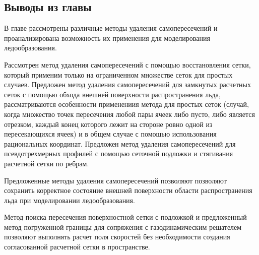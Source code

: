 \subsection{Выводы из главы}

В главе рассмотрены различные методы удаления самопересечений и проанализирована возможность их применения для моделирования ледообразования.

Рассмотрен метод удаления самопересечений с помощью восстановления сетки, который применим только на ограниченном множестве сеток для простых случаев.
Предложен метод удаления самопересечений для замкнутых расчетных сеток с помощью обхода внешней поверхности распространения льда, рассматриваются особенности применениия метода для простых сеток (случай, когда множество точек пересечения любой пары ячеек либо пусто, либо является отрезком, каждый конец которого лежит на стороне ровно одной из пересекающихся ячеек) и в общем случае с помощью использования рациональных координат.
Предложен метод удаления самопересечений для псевдотрехмерных профилей с помощью сеточной подложки и стягивания расчетной сетки по ребрам.

Предложенные методы удаления самопересечений позволяют позволяют сохранить корректное состояние внешней поверхности области распространения льда при моделировании ледообразования.

Метод поиска пересечения поверхностной сетки с подложкой и предложенный метод погруженной границы для сопряжения с газодинамическим решателем позволяют выполнять расчет поля скоростей без необходимости создания согласованной расчетной сетки в пространстве.

